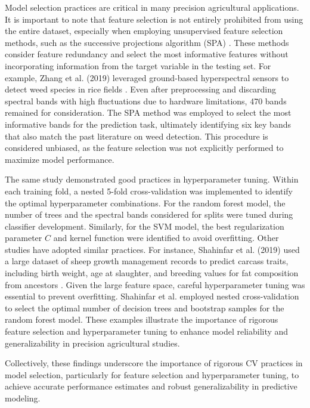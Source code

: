 Model selection practices are critical in many precision agricultural applications. It is important to note that feature selection is not entirely prohibited from using the entire dataset, especially when employing unsupervised feature selection methods, such as the successive projections algorithm (SPA) \citep{soares_successive_2013}. These methods consider feature redundancy and select the most informative features without incorporating information from the target variable in the testing set. For example, Zhang et al. (2019) leveraged ground-based hyperspectral sensors to detect weed species in rice fields \citep{zhang_automated_2019}. Even after preprocessing and discarding spectral bands with high fluctuations due to hardware limitations, 470 bands remained for consideration. The SPA method was employed to select the most informative bands for the prediction task, ultimately identifying six key bands that also match the past literature on weed detection. This procedure is considered unbiased, as the feature selection was not explicitly performed to maximize model performance.

The same study demonstrated good practices in hyperparameter tuning. Within each training fold, a nested 5-fold cross-validation was implemented to identify the optimal hyperparameter combinations. For the random forest model, the number of trees and the spectral bands considered for splits were tuned during classifier development. Similarly, for the SVM model, the best regularization parameter $C$ and kernel function were identified to avoid overfitting. Other studies have adopted similar practices. For instance, Shahinfar et al. (2019) used a large dataset of sheep growth management records to predict carcass traits, including birth weight, age at slaughter, and breeding values for fat composition from ancestors \citep{shahinfar_prediction_2019}. Given the large feature space, careful hyperparameter tuning was essential to prevent overfitting. Shahinfar et al. employed nested cross-validation to select the optimal number of decision trees and bootstrap samples for the random forest model. These examples illustrate the importance of rigorous feature selection and hyperparameter tuning to enhance model reliability and generalizability in precision agricultural studies.

Collectively, these findings underscore the importance of rigorous CV practices in model selection, particularly for feature selection and hyperparameter tuning, to achieve accurate performance estimates and robust generalizability in predictive modeling.
